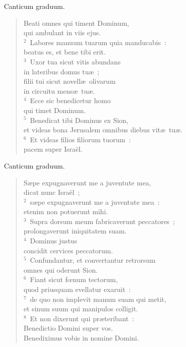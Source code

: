 \lettrine[lines=3,image=true,loversize=0.05,lraise=-0.03]{C}{}anticum graduum. \begin{flushleft}\begin{verse}\vspace{6pt}Beati omnes qui timent Dominum,\\ qui ambulant in viis ejus.\\
${}^{2}$~Labores manuum tuarum quia manducabis~:\\ beatus es, et bene tibi erit.\\
${}^{3}$~Uxor tua sicut vitis abundans\\ in lateribus domus tu\ae~;\\ filii tui sicut novell\ae\ olivarum\\ in circuitu mens\ae\ tu\ae .\\
${}^{4}$~Ecce sic benedicetur homo\\ qui timet Dominum.\\
${}^{5}$~Benedicat tibi Dominus ex Sion,\\ et videas bona Jerusalem omnibus diebus vit\ae\ tu\ae .\\
${}^{6}$~Et videas filios filiorum tuorum~:\\ pacem super Isra\"el.\end{verse}\end{flushleft}



\lettrine[lines=3,image=true,loversize=0.05,lraise=-0.03]{C}{}anticum graduum. \begin{flushleft}\begin{verse}\vspace{6pt}S\ae pe expugnaverunt me a juventute mea,\\ dicat nunc Isra\"el~;\\
${}^{2}$~s\ae pe expugnaverunt me a juventute mea~:\\ etenim non potuerunt mihi.\\
${}^{3}$~Supra dorsum meum fabricaverunt peccatores~;\\ prolongaverunt iniquitatem suam.\\
${}^{4}$~Dominus justus\\ concidit cervices peccatorum.\\
${}^{5}$~Confundantur, et convertantur retrorsum\\ omnes qui oderunt Sion.\\
${}^{6}$~Fiant sicut fœnum tectorum,\\ quod priusquam evellatur exaruit~:\\
${}^{7}$~de quo non implevit manum suam qui metit,\\ et sinum suum qui manipulos colligit.\\
${}^{8}$~Et non dixerunt qui pr\ae teribant~:\\ Benedictio Domini super vos.\\ Benediximus vobis in nomine Domini.\end{verse}\end{flushleft}



